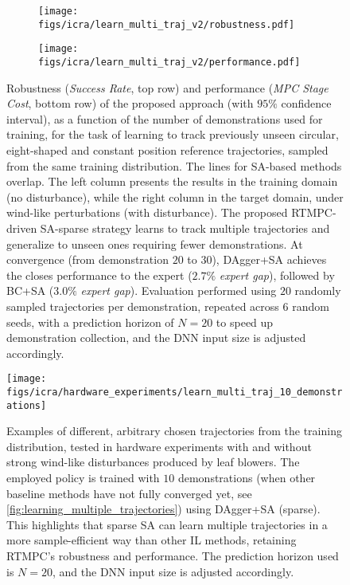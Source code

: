 \begin{figure}
\captionsetup[sub]{font=footnotesize}
\centering
\begin{subfigure}{\columnwidth}
    \centering
    \texttt{[image: figs/icra/learn\_multi\_traj\_v2/robustness.pdf]}
\end{subfigure}%
\hspace{0.1cm}
\begin{subfigure}{\columnwidth}
    \centering
    \texttt{[image: figs/icra/learn\_multi\_traj\_v2/performance.pdf]}
\end{subfigure}
    \caption{Robustness (\textit{Success Rate}, top row) and performance (\textit{MPC Stage Cost}, bottom row) of the proposed approach (with $95\%$ confidence interval), as a function of the number of demonstrations used for training, for the task of learning to track previously unseen circular, eight-shaped and constant position reference trajectories, sampled from the same training distribution. The lines for SA-based methods overlap. The left column presents the results in the training domain (no disturbance), while the right column in the target domain, under wind-like perturbations (with disturbance). The proposed RTMPC-driven SA-sparse strategy learns to track multiple trajectories and generalize to unseen ones requiring fewer demonstrations. At convergence (from demonstration $20$ to $30$), DAgger+SA achieves the closes performance to the expert ($2.7\%$ \textit{expert gap}), followed by BC+SA ($3.0\%$  \textit{expert gap}). Evaluation performed using $20$ randomly sampled trajectories per demonstration, repeated across $6$ random seeds, with a prediction horizon of $N=20$ to speed up demonstration collection, and the DNN input size is adjusted accordingly.}
    \label{fig:learning_multiple_trajectories}
    \centering
    \texttt{[image: figs/icra/hardware\_experiments/learn\_multi\_traj\_10\_demonstrations]}
    \caption{Examples of different, arbitrary chosen trajectories from the training distribution, tested in hardware experiments with and without strong wind-like disturbances produced by leaf blowers. The employed policy is trained with $10$ demonstrations (when other baseline methods have not fully converged yet, see \cref{fig:learning_multiple_trajectories}) using DAgger+SA (sparse). This highlights that sparse SA can learn multiple trajectories in a more sample-efficient way than other IL methods, retaining RTMPC's robustness and performance. The prediction horizon used is $N=20$, and the \ac{DNN} input size is adjusted accordingly.}
    \label{fig:learn_multiple_trajectories_experiment}
\end{figure}

